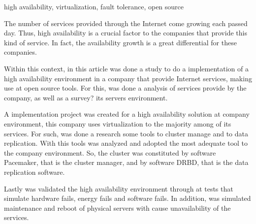 \begin{englishabstract}{}{high availability, virtualization, fault tolerance, open source}

The number of services provided through the Internet come growing each passed day. Thus, high availability is a crucial factor to the 
companies that provide this kind of service. In fact, the availability growth is a great differential for these companies.

Within this context, in this article was done a study to do a implementation of a high availability environment in a company that provide 
Internet services, making use at open source tools. For this, was done a analysis of services provide by the company, 
as well as a survey? its servers environment.

A implementation project was created for a high availability solution at company environment, this company uses virtualization to the majority
among of its services. For such, was done a research some tools to cluster manage and to data replication. With this tools was analyzed and 
adopted the most adequate tool to the company environment. So, the cluster was constituted by software Pacemaker, that is the cluster manager, 
and by software DRBD, that is the data replication software.

Lastly was validated the high availability environment through at tests that simulate hardware fails, energy fails and software fails. 
In addition, was simulated maintenance and reboot of physical servers with cause unavailability of the services.

\end{englishabstract}
